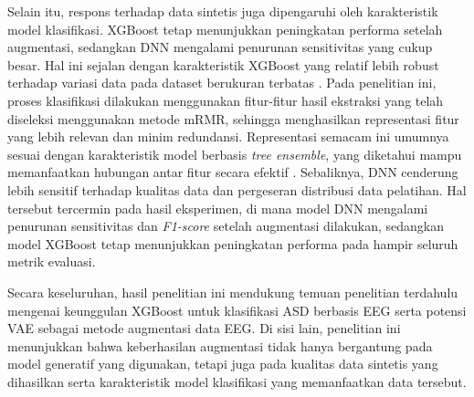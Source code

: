 Selain itu, respons terhadap data sintetis juga dipengaruhi oleh karakteristik model klasifikasi. XGBoost tetap menunjukkan peningkatan performa setelah augmentasi, sedangkan DNN mengalami penurunan sensitivitas yang cukup besar. Hal ini sejalan dengan karakteristik XGBoost yang relatif lebih robust terhadap variasi data pada dataset berukuran terbatas \cite{chen2016xgboost}. Pada penelitian ini, proses klasifikasi dilakukan menggunakan fitur-fitur hasil ekstraksi yang telah diseleksi menggunakan metode mRMR, sehingga menghasilkan representasi fitur yang lebih relevan dan minim redundansi. Representasi semacam ini umumnya sesuai dengan karakteristik model berbasis \textit{tree ensemble}, yang diketahui mampu memanfaatkan hubungan antar fitur secara efektif \cite{shwartz2022tabular}. Sebaliknya, DNN cenderung lebih sensitif terhadap kualitas data dan pergeseran distribusi data pelatihan. Hal tersebut tercermin pada hasil eksperimen, di mana model DNN mengalami penurunan sensitivitas dan \textit{F1-score} setelah augmentasi dilakukan, sedangkan model XGBoost tetap menunjukkan peningkatan performa pada hampir seluruh metrik evaluasi.

Secara keseluruhan, hasil penelitian ini mendukung temuan penelitian terdahulu mengenai keunggulan XGBoost untuk klasifikasi ASD berbasis EEG serta potensi VAE sebagai metode augmentasi data EEG. Di sisi lain, penelitian ini menunjukkan bahwa keberhasilan augmentasi tidak hanya bergantung pada model generatif yang digunakan, tetapi juga pada kualitas data sintetis yang dihasilkan serta karakteristik model klasifikasi yang memanfaatkan data tersebut.




